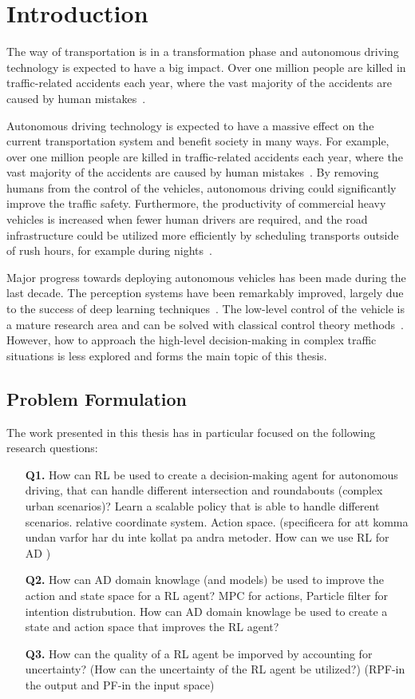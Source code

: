 \chapter{Introduction}\label{chapter:intro}
The way of transportation is in a transformation phase and autonomous driving technology is expected to have a big impact. Over one million people are killed in traffic-related accidents each year, where the vast majority of the accidents are caused by human mistakes~\cite{WHO2018, NHTSA2018}. 

Autonomous driving technology is expected to have a massive effect on the current transportation system and benefit society in many ways. For example, over one million people are killed in traffic-related accidents each year, where the vast majority of the accidents are caused by human mistakes~\cite{WHO2018, NHTSA2018}. By removing humans from the control of the vehicles, autonomous driving could significantly improve the traffic safety. Furthermore, the productivity of commercial heavy vehicles is increased when fewer human drivers are required, and the road infrastructure could be utilized more efficiently by scheduling transports outside of rush hours, for example during nights~\cite{FAGNANT2015167}.

Major progress towards deploying autonomous vehicles has been made during the last decade. The perception systems have been remarkably improved, largely due to the success of deep learning techniques~\cite{Janai2020}. The low-level control of the vehicle is a mature research area and can be solved with classical control theory methods~\cite{Paden2016}. However, how to approach the high-level decision-making in complex traffic situations is less explored and forms the main topic of this thesis.

\section{Problem Formulation}
The work presented in this thesis has in particular focused on the following research questions:
\begin{enumerate}
	\item[\textbf{Q1.}] How can RL be used to create a decision-making agent for autonomous driving, that can handle different intersection and roundabouts (complex urban scenarios)? Learn a scalable policy that is able to handle different scenarios. relative coordinate system. Action space. 
	(specificera for att komma undan varfor har du inte kollat pa andra metoder. How can we use RL for AD )
	\item[\textbf{Q2.}] How can AD domain knowlage (and models) be used to improve the action and state space for a RL agent? MPC for actions, Particle filter for intention distrubution. How can AD domain knowlage be used to create a state and action space that improves the RL agent?
	\item[\textbf{Q3.}] How can the quality of a RL agent be imporved by accounting for uncertainty?
	(How can the uncertainty of the RL agent be utilized?) (RPF-in the output and PF-in the input space)
\end{enumerate}



